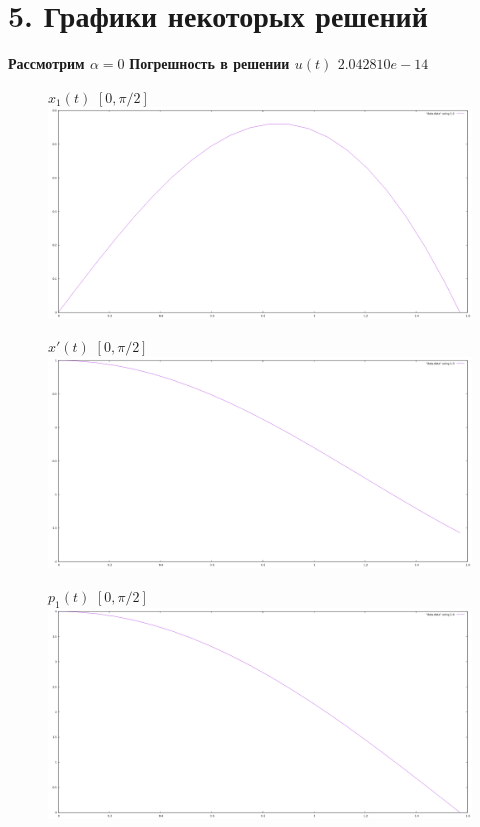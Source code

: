 \documentclass[titlepage]{article}
\begin{document}
\section{5. Графики некоторых решений}
\textbf{Рассмотрим $\alpha = 0$}
\textbf{Погрешность в решении $u(t)$  $2.042810e-14$}
\begin{figure}[h!]
$x_1(t)$  $[0, \pi/2]$\\
\centering
\includegraphics[width=1\linewidth]{x_1(t).png} 
\end{figure}
\newpage
\begin{figure}[h!]
$x'(t)$ $[0, \pi/2]$\\
\centering
\includegraphics[width=1\linewidth]{x_2(t).png} 
\end{figure}
\begin{figure}[h!]
$p_1(t)$ $[0, \pi/2]$\\
\centering
\includegraphics[width=1\linewidth]{p_1(t).png} 
\end{figure}
\end{document}
